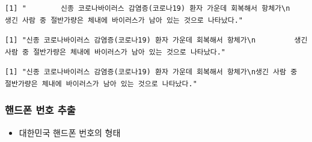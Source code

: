\documentclass[
  11pt,
]{krantz}
\newenvironment{Shaded}{\begin{snugshade}}{\end{snugshade}}
\newcommand{\CharTok}[1]{\textcolor[rgb]{0.5,0.5,0.5}{#1}}
\newcommand{\CommentTok}[1]{\textcolor[rgb]{0.37,0.37,0.37}{\textit{#1}}}
\newcommand{\KeywordTok}[1]{\textcolor[rgb]{0.27,0.27,0.27}{\textbf{#1}}}
\newcommand{\NormalTok}[1]{#1}
\newcommand{\StringTok}[1]{\textcolor[rgb]{0.5,0.5,0.5}{#1}}
\providecommand{\tightlist}{%
  \setlength{\itemsep}{0pt}\setlength{\parskip}{0pt}}
\begin{document}
\begin{verbatim}
[1] "        신종 코로나바이러스 감염증(코로나19) 환자 가운데 회복해서 항체가\n         생긴 사람 중 절반가량은 체내에 바이러스가 남아 있는 것으로 나타났다."
\end{verbatim}

\begin{Shaded}
\end{Shaded}

\begin{verbatim}
[1] "신종 코로나바이러스 감염증(코로나19) 환자 가운데 회복해서 항체가\n         생긴 사람 중 절반가량은 체내에 바이러스가 남아 있는 것으로 나타났다."
\end{verbatim}

\begin{Shaded}
\end{Shaded}

\begin{verbatim}
[1] "신종 코로나바이러스 감염증(코로나19) 환자 가운데 회복해서 항체가\n생긴 사람 중 절반가량은 체내에 바이러스가 남아 있는 것으로 나타났다."
\end{verbatim}

\normalsize

\hypertarget{regex-cellphone}{%
\subsubsection*{\texorpdfstring{\textbf{핸드폰 번호 추출}}{핸드폰 번호 추출}}\label{regex-cellphone}}


\begin{itemize}
\tightlist
\item
  대한민국 핸드폰 번호의 형태
\end{itemize}
\end{document}
